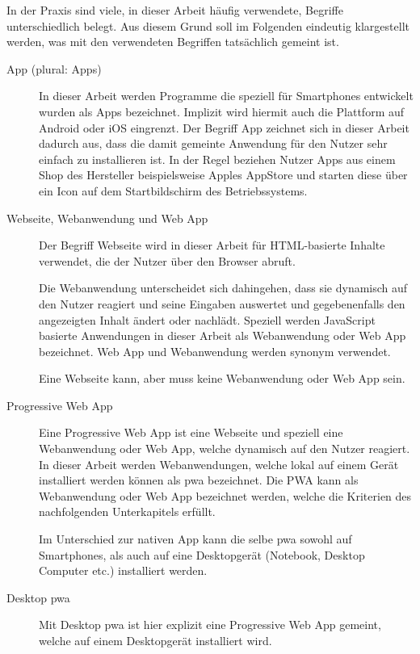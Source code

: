 In der Praxis sind viele, in dieser Arbeit häufig verwendete, Begriffe unterschiedlich belegt. Aus diesem Grund soll im Folgenden eindeutig klargestellt werden, was mit den verwendeten Begriffen tatsächlich gemeint ist.

\begin{description}
	\item [App (plural: Apps)]
		In dieser Arbeit werden Programme die speziell für Smartphones entwickelt wurden als Apps bezeichnet. Implizit wird hiermit auch die Plattform auf Android oder iOS eingrenzt. Der Begriff App zeichnet sich in dieser Arbeit dadurch aus, dass die damit gemeinte Anwendung für den Nutzer sehr einfach zu installieren ist. In der Regel beziehen Nutzer Apps aus einem Shop des Hersteller beispielsweise Apples AppStore und starten diese über ein Icon auf dem Startbildschirm des Betriebssystems.
		
	\item [Webseite, Webanwendung und Web App]
		Der Begriff Webseite wird in dieser Arbeit für HTML-basierte Inhalte verwendet, die der Nutzer über den Browser abruft.
		
		Die Webanwendung unterscheidet sich dahingehen, dass sie dynamisch auf den Nutzer reagiert und seine Eingaben auswertet und gegebenenfalls den angezeigten Inhalt ändert oder nachlädt. Speziell werden JavaScript basierte Anwendungen in dieser Arbeit als Webanwendung oder Web App bezeichnet. Web App und Webanwendung werden synonym verwendet.
		
		Eine Webseite kann, aber muss keine Webanwendung oder Web App sein.
	
	\item [Progressive Web App]
		Eine Progressive Web App ist eine Webseite und speziell eine Webanwendung oder Web App, welche dynamisch auf den Nutzer reagiert.
		In dieser Arbeit werden Webanwendungen, welche lokal auf einem Gerät installiert werden können als \acf{pwa} bezeichnet. Die PWA kann als Webanwendung oder Web App bezeichnet werden, welche die Kriterien des nachfolgenden Unterkapitels erfüllt.
		
		Im Unterschied zur nativen App kann die selbe \ac{pwa} sowohl auf Smartphones, als auch auf eine Desktopgerät (Notebook, Desktop Computer etc.) installiert werden.
		
	\item [Desktop \ac{pwa}]
		Mit Desktop \ac{pwa} ist hier explizit eine Progressive Web App gemeint, welche auf einem Desktopgerät installiert wird.
			

\end{description}
